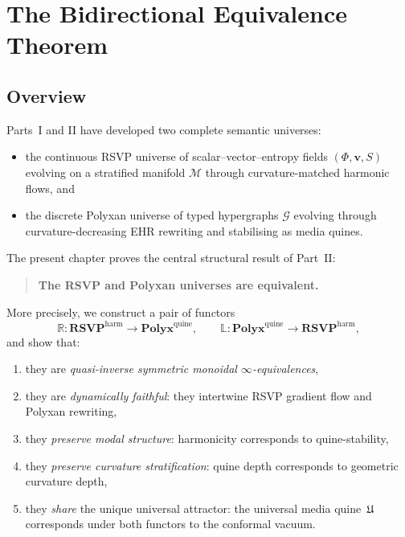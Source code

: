 \chapter{The Bidirectional Equivalence Theorem}
\label{ch:bidirectional-equivalence}

\section{Overview}

Parts~I and II have developed two complete semantic universes:

\begin{itemize}
\item the continuous RSVP universe of scalar--vector--entropy fields
  $(\Phi,\mathbf{v},S)$ evolving on a stratified manifold $\mathcal{M}$ through
  curvature-matched harmonic flows, and

\item the discrete Polyxan universe of typed hypergraphs $\mathcal{G}$ evolving
  through curvature-decreasing EHR rewriting and stabilising as media quines.
\end{itemize}

The present chapter proves the central structural result of Part~II:  

\begin{quote}
\textbf{The RSVP and Polyxan universes are equivalent.}
\end{quote}

More precisely, we construct a pair of functors
\[
\mathbb{R} : \mathbf{RSVP}^{\mathrm{harm}} \longrightarrow \mathbf{Polyx}^{\mathrm{quine}},
\qquad
\mathbb{L} : \mathbf{Polyx}^{\mathrm{quine}} \longrightarrow 
\mathbf{RSVP}^{\mathrm{harm}},
\]
and show that:

\begin{enumerate}
\item they are \emph{quasi-inverse symmetric monoidal $\infty$-equivalences},
\item they are \emph{dynamically faithful}: they intertwine RSVP gradient flow
  and Polyxan rewriting,
\item they \emph{preserve modal structure}: harmonicity corresponds to
  quine-stability,
\item they \emph{preserve curvature stratification}: quine depth corresponds to
  geometric curvature depth,
\item they \emph{share} the unique universal attractor: the universal media
  quine~$\mathfrak{U}$ corresponds under both functors to the conformal vacuum.
\end{enumerate}

